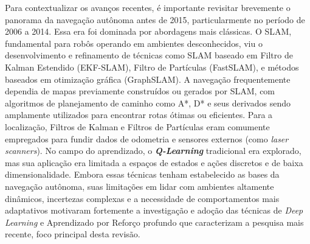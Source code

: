 Para contextualizar os avanços recentes, é importante revisitar brevemente o panorama da navegação autônoma antes de 2015, particularmente no período de 2006 a 2014. Essa era foi dominada por abordagens mais clássicas. O \ac{SLAM}, fundamental para robôs operando em ambientes desconhecidos, viu o desenvolvimento e refinamento de técnicas como \ac{SLAM} baseado em Filtro de Kalman Estendido (EKF-SLAM), Filtro de Partículas (FastSLAM), e métodos baseados em otimização gráfica (GraphSLAM). A navegação frequentemente dependia de mapas previamente construídos ou gerados por \ac{SLAM}, com algoritmos de planejamento de caminho como A*, D* e seus derivados sendo amplamente utilizados para encontrar rotas ótimas ou eficientes. Para a localização, Filtros de Kalman e Filtros de Partículas eram comumente empregados para fundir dados de odometria e sensores externos (como \textit{laser scanners}). No campo do aprendizado, o \textbf{\textit{Q-Learning}} tradicional era explorado, mas sua aplicação era limitada a espaços de estados e ações discretos e de baixa dimensionalidade. Embora essas técnicas tenham estabelecido as bases da navegação autônoma, suas limitações em lidar com ambientes altamente dinâmicos, incertezas complexas e a necessidade de comportamentos mais adaptativos motivaram fortemente a investigação e adoção das técnicas de \textit{Deep Learning} e Aprendizado por Reforço profundo que caracterizam a pesquisa mais recente, foco principal desta revisão.


